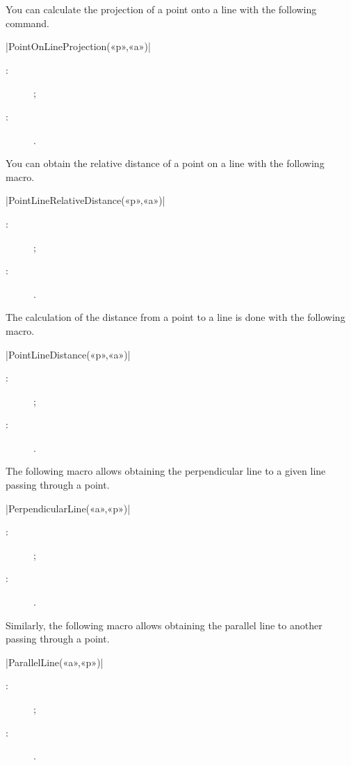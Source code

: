 \documentclass[a4paper,english]{article}
\begin{document}
You can calculate the projection of a point onto a line with the following command.

\begin{colourband}
\macro|PointOnLineProjection(«p»,«a»)|
\begin{description}
  \item[:]  ;
  \item[:]  .
\end{description}
\end{colourband}

You can obtain the relative distance of a point on a line with the following macro.
\begin{colourband}
\macro|PointLineRelativeDistance(«p»,«a»)|
\begin{description}
  \item[:]  ;
  \item[:]  .
\end{description}
\end{colourband}
The calculation of the distance from a point to a line is done with the following macro.
\begin{colourband}
\macro|PointLineDistance(«p»,«a»)|
\begin{description}
  \item[:]  ;
  \item[:]  .
\end{description}
\end{colourband}

The following macro allows obtaining the perpendicular line to a given line passing through a point.
\begin{colourband}
\macro|PerpendicularLine(«a»,«p»)|
\begin{description}
  \item[:]   ;
  \item[:] .
\end{description}
\end{colourband}

Similarly, the following macro allows obtaining the parallel line to another passing through a point.
\begin{colourband}
\macro|ParallelLine(«a»,«p»)|
\begin{description}
  \item[:]   ;
  \item[:] .
\end{description}
\end{colourband}
\end{document}
